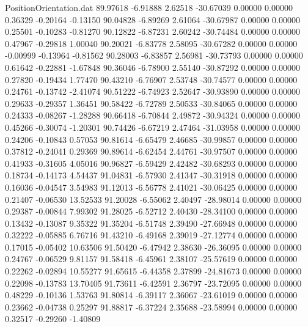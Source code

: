 \begin{filecontents}{PositionOrientation.dat}
  89.97618   -6.91888    2.62518   -30.67039    0.00000    0.00000    0.36329   -0.20164   -0.13150
  90.04828   -6.89269    2.61064   -30.67987    0.00000    0.00000    0.25501   -0.10283   -0.81270
  90.12822   -6.87231    2.60242   -30.74484    0.00000    0.00000    0.47967   -0.29818    1.00040
  90.20021   -6.83778    2.58095   -30.67282    0.00000    0.00000   -0.00999   -0.13964   -0.81562
  90.28003   -6.83857    2.56981   -30.73793    0.00000    0.00000    0.61642   -0.22881   -1.67848
  90.36046   -6.78900    2.55140   -30.87292    0.00000    0.00000    0.27820   -0.19434    1.77470
  90.43210   -6.76907    2.53748   -30.74577    0.00000    0.00000    0.24761   -0.13742   -2.41074
  90.51222   -6.74923    2.52647   -30.93890    0.00000    0.00000    0.29633   -0.29357    1.36451
  90.58422   -6.72789    2.50533   -30.84065    0.00000    0.00000    0.24333   -0.08267   -1.28288
  90.66418   -6.70844    2.49872   -30.94324    0.00000    0.00000    0.45266   -0.30074   -1.20301
  90.74426   -6.67219    2.47464   -31.03958    0.00000    0.00000    0.24206   -0.10843    0.57053
  90.81614   -6.65479    2.46685   -30.99857    0.00000    0.00000    0.37812   -0.24041    0.29369
  90.89614   -6.62454    2.44761   -30.97507    0.00000    0.00000    0.41933   -0.31605    4.05016
  90.96827   -6.59429    2.42482   -30.68293    0.00000    0.00000    0.18734   -0.14173    4.54437
  91.04831   -6.57930    2.41347   -30.31918    0.00000    0.00000    0.16036   -0.04547    3.54983
  91.12013   -6.56778    2.41021   -30.06425    0.00000    0.00000    0.21407   -0.06530   13.52533
  91.20028   -6.55062    2.40497   -28.98014    0.00000    0.00000    0.29387   -0.00844    7.99302
  91.28025   -6.52712    2.40430   -28.34100    0.00000    0.00000    0.13432   -0.13087    9.35322
  91.35204   -6.51748    2.39490   -27.66948    0.00000    0.00000    0.32222   -0.05885    6.76716
  91.43210   -6.49168    2.39019   -27.12774    0.00000    0.00000    0.17015   -0.05402   10.63506
  91.50420   -6.47942    2.38630   -26.36095    0.00000    0.00000    0.24767   -0.06529    9.81157
  91.58418   -6.45961    2.38107   -25.57619    0.00000    0.00000    0.22262   -0.02894   10.55277
  91.65615   -6.44358    2.37899   -24.81673    0.00000    0.00000    0.22098   -0.13783   13.70405
  91.73611   -6.42591    2.36797   -23.72095    0.00000    0.00000    0.48229   -0.10136    1.53763
  91.80814   -6.39117    2.36067   -23.61019    0.00000    0.00000    0.23662   -0.04738    0.25297
  91.88817   -6.37224    2.35688   -23.58994    0.00000    0.00000    0.32517   -0.29260   -1.40809

\end{filecontents}
